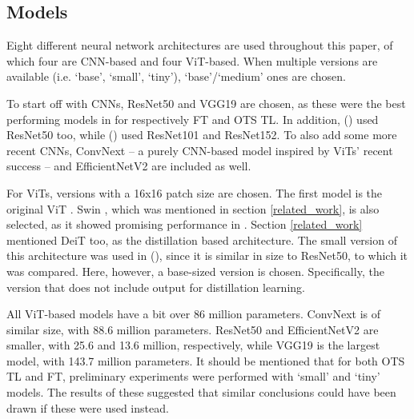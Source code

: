 \subsection{Models} \label{methods:models}
Eight different neural network architectures are used throughout this paper, of which four are CNN-based and four ViT-based. When multiple versions are available (i.e. `base', `small', `tiny'), `base'/`medium' ones are chosen.

To start off with CNNs, ResNet50 \citep{he2016deep} and VGG19 \citep{simonyan2014very} are chosen, as these were the best performing models in \citeauthor{sabatelli2018deep} for respectively FT and OTS TL. In addition, \citeauthor{matsoukas2021time} (\citeyear{matsoukas2021time}) used ResNet50 too, while \citeauthor{zhou2021convnets} (\citeyear{zhou2021convnets}) used ResNet101 and ResNet152. To also add some more recent CNNs, ConvNext \citep{liu2022convnet} -- a purely CNN-based model inspired by ViTs' recent success -- and EfficientNetV2 \citep{tan2021efficientnetv2} are included as well.

For ViTs, versions with a 16x16 patch size are chosen. The first model is the original ViT \citep{dosovitskiy2020image}. Swin \citep{liu2021swin}, which was mentioned in section \ref{related_work}, is also selected, as it showed promising performance in \citeauthor{zhou2021convnets}. Section \ref{related_work} mentioned DeiT \citep{touvron2021training} too, as the distillation based architecture. The small version of this architecture was used in \citeauthor{matsoukas2021time} (\citeyear{matsoukas2021time}), since it is similar in size to ResNet50, to which it was compared. Here, however, a base-sized version is chosen. Specifically, the version that does not include output for distillation learning.

All ViT-based models have a bit over 86 million parameters. ConvNext is of similar size, with 88.6 million parameters. ResNet50 and EfficientNetV2 are smaller, with 25.6 and 13.6 million, respectively, while VGG19 is the largest model, with 143.7 million parameters. It should be mentioned that for both OTS TL and FT, preliminary experiments were performed with `small' and `tiny' models. The results of these suggested that similar conclusions could have been drawn if these were used instead.

